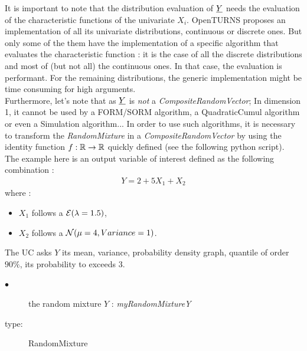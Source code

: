 It is important to note that the distribution evaluation of ${\underline{Y}}$ needs the evaluation of the characteristic functions of the univariate $X_i$. OpenTURNS proposes an implementation of all its univariate distributions, continuous or discrete ones. But only some of the them have the implementation of a specific algorithm that evaluates the characteristic function : it is the case of all the discrete distributions and most of (but not all) the continuous ones. In that case, the evaluation is performant. For the remaining distributions, the generic implementation might be time consuming for high arguments. \\

Furthermore, let's note that as ${\underline{Y}}$ is \emph{not} a {\itshape CompositeRandomVector}; In dimension 1, it cannot be used by a FORM/SORM algorithm, a QuadraticCumul algorithm or even a Simulation algorithm... In order to use such algorithms, it is necessary to transform the {\itshape RandomMixture} in a {\itshape CompositeRandomVector} by using the identity function $f : {\mathbb R} \rightarrow {\mathbb R}$ quickly defined (see the following python script).\\

The example here is an output variable of interest defined as the following combination :
\begin{align*}
  Y = 2 + 5X_1 + X_2
\end{align*}
where :
\begin{itemize}
\item  $X_1$ follows a ${\mathcal E}(\lambda = 1.5)$,
\item  $X_2$ follows a ${\mathcal N}(\mu = 4,Variance = 1)$.
\end{itemize}

The UC asks $Y$ its mean, variance, probability density graph, quantile of order $90\%$, its probability to exceeds 3.



\noindent%
             {
               \begin{description}
               \item[$\bullet$] the random mixture $Y$ : {\itshape myRandomMixtureY}
               \item[type:] RandomMixture
               \end{description}
             }

